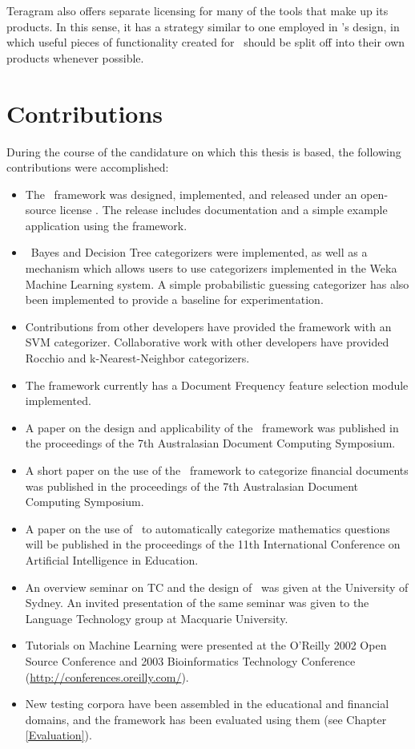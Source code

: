 Teragram also offers separate licensing for many of the tools that
make up its products.  In this sense, it has a strategy similar to one
employed in \aicat's design, in which useful pieces of
functionality created for \aicat\ should be split off into
their own products whenever possible.

\section{Contributions}

During the course of the candidature on which this thesis is based,
the following contributions were accomplished:

\begin{itemize}
\item The \aicat\ framework was designed, implemented, and released
  under an open-source license \cite{cpan}.  The release includes
  documentation and a simple example application using the framework.
\item \naive\ Bayes and Decision Tree categorizers were implemented,
  as well as a mechanism which allows users to use categorizers
  implemented in the Weka Machine Learning system\cite{weka:99}.  A
  simple probabilistic guessing categorizer has also been implemented
  to provide a baseline for experimentation.
\item Contributions from other developers have provided the framework
  with an SVM categorizer.  Collaborative work with other developers
  have provided Rocchio and k-Nearest-Neighbor categorizers.
\item The framework currently has a Document Frequency feature
  selection module implemented.
\item A paper on the design and applicability of the \aicat\ framework
  was published in the proceedings of the 7th Australasian Document
  Computing Symposium. \cite{williams:02}
\item A short paper on the use of the \aicat\ framework to categorize
  financial documents was published in the proceedings of the
  7th Australasian Document Computing Symposium. \cite{calvo:02}
\item A paper on the use of \aicat\ to automatically categorize
  mathematics questions will be published in the
  proceedings of the 11th International Conference on Artificial Intelligence in
  Education.  \cite{williams:03}
\item An overview seminar on TC and the design of \aicat\ was given at
  the University of Sydney.  An invited presentation of the same
  seminar was given to the Language Technology group at Macquarie
  University.
\item Tutorials on Machine Learning were presented at the O'Reilly
  2002 Open Source Conference and 2003 Bioinformatics Technology
  Conference (\url{http://conferences.oreilly.com/}).
\item New testing corpora have been assembled in the educational and
  financial domains, and the framework has been evaluated using them
  (see Chapter \ref{Evaluation}).
\end{itemize}


